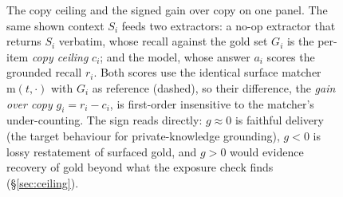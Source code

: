 \begin{figure}[t]
{}
\caption{The copy ceiling and the signed gain over copy on one panel. The same shown context $S_i$ feeds
two extractors: a no-op extractor that returns $S_i$ verbatim, whose recall against the gold set $G_i$
is the per-item \emph{copy ceiling} $c_i$; and the model, whose answer $a_i$ scores the grounded recall
$r_i$. Both scores use the identical surface matcher $\mathrm{m}(t,\cdot)$ with $G_i$ as reference
(dashed), so their difference, the \emph{gain over copy} $g_i=r_i-c_i$, is first-order insensitive to
the matcher's under-counting. The sign reads directly: $g\approx0$ is faithful delivery (the target
behaviour for private-knowledge grounding), $g<0$ is lossy restatement of surfaced gold, and $g>0$
would evidence recovery of gold beyond what the exposure check finds (\S\ref{sec:ceiling}).}
\label{fig:ceiling}
\end{figure}
